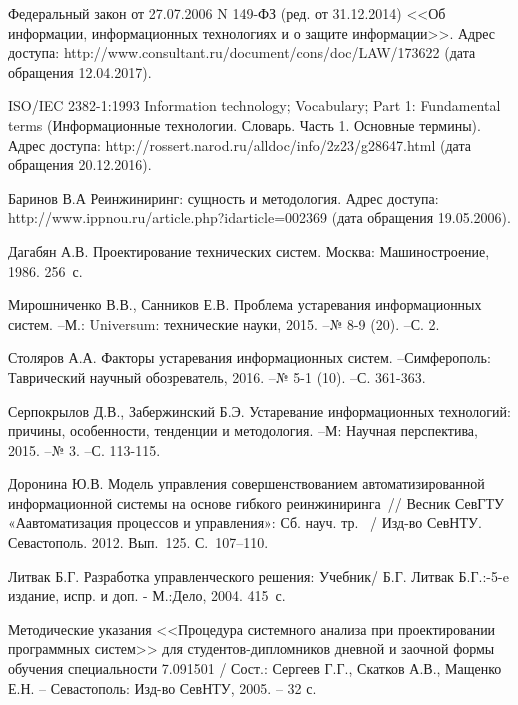 \begingroup
\renewcommand{\section}[2]{\anonsection{Библиографический список}}
\begin{thebibliography}{00}

 Федеральный закон от 27.07.2006 N 149-ФЗ (ред. от 31.12.2014) <<Об информации, информационных технологиях и о защите информации>>.
Адрес доступа: http://www.consultant.ru/document/cons/doc/LAW/173622 (дата обращения 12.04.2017).

 ISO/IEC 2382-1:1993 Information technology; Vocabulary; Part 1: Fundamental terms (Информационные технологии. Словарь. Часть 1. Основные термины).
Адрес доступа: http://rossert.narod.ru/alldoc/info/2z23/g28647.html (дата обращения 20.12.2016).

Баринов В.А Реинжиниринг: сущность и методология. 
Адрес доступа: http://www.ippnou.ru/article.php?idarticle=002369 (дата обращения 19.05.2006).

Дагабян А.В. Проектирование технических систем. 
Москва: Машиностроение, 1986. 256~с.

Мирошниченко В.В., Санников Е.В.
Проблема устаревания информационных систем. 
--М.: Universum: технические науки, 2015. --№ 8-9 (20). --С. 2. 

Столяров А.А.
Факторы устаревания информационных систем.
--Симферополь: Таврический научный обозреватель, 2016. --№ 5-1 (10). --С. 361-363. 

Серпокрылов Д.В., Забержинский Б.Э.
Устаревание информационных технологий: причины, особенности, тенденции и методология.
--М: Научная перспектива, 2015. --№ 3. --С. 113-115. 

Доронина Ю.В. Модель управления совершенствованием автоматизированной информационной системы на основе гибкого реинжиниринга~//
 Весник СевГТУ «Аавтоматизация процессов и управления»: Сб. науч. тр. ~/ Изд-во СевНТУ. Севастополь. 2012. Вып.~125. С.~107--110.

Литвак Б.Г. Разработка управленческого решения: Учебник/ 
Б.Г. Литвак Б.Г.:-5-e издание, испр. и доп. - М.:Дело, 2004. 415~с.

    Методические указания <<Процедура системного анализа при проектировании программных систем>>
    для студентов-дипломников дневной и заочной формы  обучения специальности 7.091501 /
    Сост.: Сергеев Г.Г., Скатков А.В., Мащенко Е.Н. -- Севастополь:
    Изд-во СевНТУ, 2005. -- 32 с.


\end{thebibliography}
